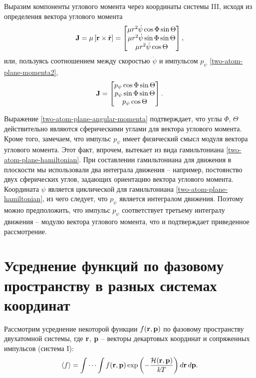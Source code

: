 Выразим компоненты углового момента через координаты системы III, исходя из определения вектора углового момента 
\begin{gather}
    \mathbf{J} = \mu \left[ \mathbf{r} \times \dot{\mathbf{r}} \right] = 
    \begin{bmatrix}
        \mu r^2 \dot{\psi} \cos \Phi \sin \Theta \\ 
        \mu r^2 \dot{\psi} \sin \Phi \sin \Theta \\
        \mu r^2 \dot{\psi} \cos \Theta
    \end{bmatrix},
\end{gather}
или, пользуясь соотношением между скоростью $\dot{\psi}$ и импульсом $p_\psi$ \eqref{two-atom-plane-momenta2}, 
\begin{gather}
    \mathbf{J} = 
    \begin{bmatrix}
        p_\psi \cos \Phi \sin \Theta \\
        p_\psi \sin \Phi \sin \Theta \\
        p_\psi \cos \Theta
    \end{bmatrix}. \label{two-atom-plane-angular-momenta}
\end{gather}

Выражение \eqref{two-atom-plane-angular-momenta} подтверждает, что углы $\Phi$, $\Theta$ действительно являются сферическими углами для вектора углового момента. Кроме того, замечаем, что импульс $p_\psi$ имеет физический смысл модуля вектора углового момента. Этот факт, впрочем, вытекает из вида гамильтониана \eqref{two-atom-plane-hamiltonian}. При составлении гамильтониана для движения в плоскости мы использовали два интеграла движения -- например, постоянство двух сферических углов, задающих ориентацию вектора углового момента. Координата $\psi$ является циклической для гамильтониана \eqref{two-atom-plane-hamiltonian}, из чего следует, что $p_\psi$ является интегралом движения. Поэтому можно предположить, что импульс $p_\psi$ соответствует третьему интегралу движения -- модулю вектора углового момента, что и подтверждает приведенное рассмотрение. \par

\section{Усреднение функций по фазовому пространству в разных системах координат} \label{section:averaging}

Рассмотрим усреднение некоторой функции $f(\mathbf{r}, \mathbf{p})$ по фазовому пространству двухатомной системы, где $\mathbf{r}$, $\mathbf{p}$ -- векторы декартовых координат и сопряженных импульсов (система I): 
\begin{gather}
    \langle f \rangle = \idotsint f(\mathbf{r}, \mathbf{p}) \exp \left( -\frac{\mathcal{H}(\mathbf{r},\mathbf{p})}{kT} \right) d \mathbf{r} \, d\mathbf{p}. \label{two-atom-mean}
\end{gather}

